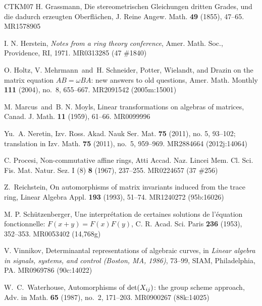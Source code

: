 \documentclass[12pt]{amsart}
\numberwithin{equation}{section}
\numberwithin{subsection}{section}
\theoremstyle{definition} \newtheorem{definition}[theorem]{Definition}
\begin{document}
\begin{thebibliography}{CTKM07}
H. Grassmann, Die stereometrischen Gleichungen dritten Grades, 
und die dadurch erzeugten Oberfl\"achen, J. Reine Angew. Math. 
{\bf 49} (1855), 47--65. MR1578905

I. N. Herstein, {\it Notes from a ring theory conference}, Amer. 
Math. Soc., Providence, RI, 1971. MR0313285 (47 \#1840)

O. Holtz, V. Mehrmann\ and\ H. Schneider, Potter, Wielandt, 
and Drazin on the matrix equation $AB=\omega BA$: new answers 
to old questions, Amer. Math. Monthly {\bf 111} (2004), 
no.~8, 655--667. MR2091542 (2005m:15001)

M. Marcus\ and\ B. N. Moyls, Linear transformations on algebras 
of matrices, Canad. J. Math. {\bf 11} (1959), 61--66. MR0099996

%

Yu.\ A. Neretin, Izv. Ross. Akad. Nauk Ser. Mat. {\bf 75} (2011), no. 5, 
93--102; translation in Izv. Math. {\bf 75} (2011), no.~5, 959--969. 
MR2884664 (2012j:14064)

C. Procesi, Non-commutative affine rings, Atti Accad. Naz. Lincei Mem. Cl. Sci. Fis. Mat. Natur. Sez. I (8) {\bf 8} (1967), 237--255. MR0224657 (37 \#256)

Z.~Reichstein, On automorphisms of matrix invariants induced from 
the trace ring, Linear Algebra Appl. {\bf 193} (1993), 51--74. 
MR1240272 (95b:16026)

M. P. Sch\"utzenberger, Une interpr\'etation de certaines 
solutions de l'\'equation fonctionnelle: $F(x+y)=F(x)F(y)$, 
C. R. Acad. Sci. Paris {\bf 236} (1953), 352--353. MR0053402 (14,768g)

V. Vinnikov, Determinantal representations of algebraic curves, in {\it Linear algebra in signals, systems, and control (Boston, MA, 1986)}, 73--99, SIAM, Philadelphia, PA. MR0969786 (90c:14022)

W.~C.~Waterhouse, Automorphisms of ${\rm det}(X\sb {ij})$: the group scheme approach, Adv. in Math. {\bf 65} (1987), no.~2, 171--203. MR0900267 (88k:14025) 
\end{thebibliography}
\end{document}
